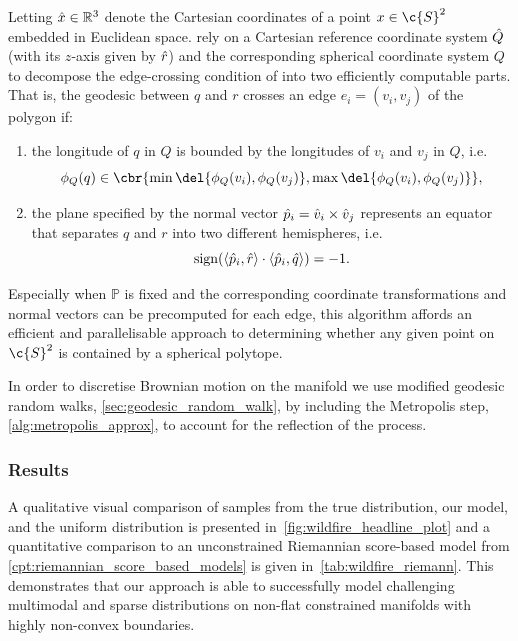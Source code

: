 Letting \(\Hat{x}\in\mathbb{R}^3\) denote the Cartesian coordinates of a point \(x\in\c{S}^2\) embedded in Euclidean space.
\cite{ketzner2022robust} rely on a Cartesian reference coordinate system \(\Hat{Q}\) (with its \(z\)-axis given by \(\Hat{r}\)) and the corresponding spherical coordinate system \(Q\) to decompose the edge-crossing condition of \textcite{bevis1989locating} into two efficiently computable parts.
That is, the geodesic between \(q\) and \(r\) crosses an edge \(e_i=(v_i, v_j)\) of the polygon if: \begin{enumerate}[label=(\roman*)] \item the longitude of \(q\) in \(Q\) is bounded by the longitudes of \(v_i\) and \(v_j\) in \(Q\), i.e. \[ \phi_{Q}(q)\in\cbr{\min\del{\phi_{Q}(v_i), \phi_{Q}(v_j)}, \max\del{\phi_{Q}(v_i), \phi_{Q}(v_j)}}, \] \item the plane specified by the normal vector \(\Hat{p}_i=\Hat{v}_i\times \Hat{v}_j\) represents an equator that separates \({q}\) and \({r}\) into two different hemispheres, i.e. $$ \operatorname{sign}(\langle \Hat{p}_i, \Hat{r} \rangle \cdot \langle \Hat{p}_i, \Hat{q} \rangle) = -1.
	      $$
\end{enumerate}

Especially when \(\mathbb{P}\) is fixed and the corresponding coordinate transformations and normal vectors can be precomputed for each edge, this algorithm affords an efficient and parallelisable approach to determining whether any given point on \(\c{S}^2\) is contained by a spherical polytope.

In order to discretise Brownian motion on the manifold we use modified geodesic random walks, \cref{sec:geodesic_random_walk}, by including the Metropolis step, \cref{alg:metropolis_approx}, to account for the reflection of the process.

\subsubsection{Results}

A qualitative visual comparison of samples from the true distribution, our model, and the uniform distribution is presented in~\cref{fig:wildfire_headline_plot} and a quantitative comparison to an unconstrained Riemannian score-based model from \cref{cpt:riemannian_score_based_models} is given in~\cref{tab:wildfire_riemann}.
This demonstrates that our approach is able to successfully model challenging multimodal and sparse distributions on non-flat constrained manifolds with highly non-convex boundaries.

